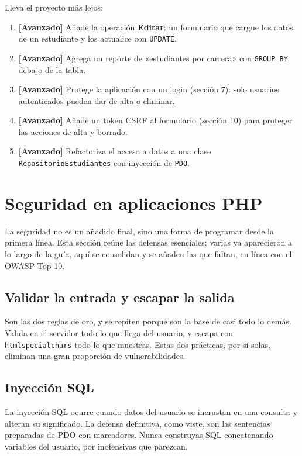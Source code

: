 \documentclass[11pt]{article}
\begin{document}
Lleva el proyecto más lejos:

\begin{enumerate}[leftmargin=1.7em,itemsep=3pt,topsep=2pt]
\item \textbf{[Avanzado]} Añade la operación \textbf{Editar}: un formulario que cargue los datos de un estudiante y los actualice con \texttt{UPDATE}.
\item \textbf{[Avanzado]} Agrega un reporte de «estudiantes por carrera» con \texttt{GROUP BY} debajo de la tabla.
\item \textbf{[Avanzado]} Protege la aplicación con un login (sección 7): solo usuarios autenticados pueden dar de alta o eliminar.
\item \textbf{[Avanzado]} Añade un token CSRF al formulario (sección 10) para proteger las acciones de alta y borrado.
\item \textbf{[Avanzado]} Refactoriza el acceso a datos a una clase \texttt{RepositorioEstudiantes} con inyección de \texttt{PDO}.
\end{enumerate}
\section{Seguridad en aplicaciones PHP}
La seguridad no es un añadido final, sino una forma de programar desde la primera línea. Esta sección reúne las defensas esenciales; varias ya aparecieron a lo largo de la guía, aquí se consolidan y se añaden las que faltan, en línea con el OWASP Top 10.

\subsection{Validar la entrada y escapar la salida}
Son las dos reglas de oro, y se repiten porque son la base de casi todo lo demás. Valida en el servidor todo lo que llega del usuario, y escapa con \texttt{htmlspecialchars} todo lo que muestras. Estas dos prácticas, por sí solas, eliminan una gran proporción de vulnerabilidades.

\subsection{Inyección SQL}
La inyección SQL ocurre cuando datos del usuario se incrustan en una consulta y alteran su significado. La defensa definitiva, como viste, son las sentencias preparadas de PDO con marcadores. Nunca construyas SQL concatenando variables del usuario, por inofensivas que parezcan.
\end{document}
